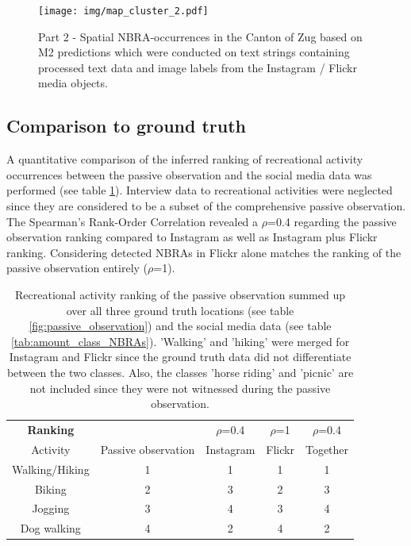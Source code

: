 \begin{figure}[h!]
   \centering
   \texttt{[image: img/map\_cluster\_2.pdf]}
   \caption{Part 2 - Spatial NBRA-occurrences in the Canton of Zug based on M2 predictions which were conducted on text strings containing processed text data and image labels from the Instagram / Flickr media objects.}
   \label{fig:map_cluster_2}
\end{figure}

\subsection{Comparison to ground truth} \label{results_comp_ground_truth}
A quantitative comparison of the inferred ranking of recreational activity occurrences between the passive observation and the social media data was performed (see table \ref{tab:compare_ranking}). Interview data to recreational activities were neglected since they are considered to be a subset of the comprehensive passive observation. The Spearman's Rank-Order Correlation revealed a $\rho$=0.4 regarding the passive observation ranking compared to Instagram as well as Instagram plus Flickr ranking. Considering detected NBRAs in Flickr alone matches the ranking of the passive observation entirely ($\rho$=1). \\

\begin{table}[h!]
\begin{center}
\caption{Recreational activity ranking of the passive observation summed up over all three ground truth locations (see table \ref{fig:passive_observation}) and the social media data (see table \ref{tab:amount_class_NBRAs}). 'Walking' and 'hiking' were merged for Instagram and Flickr since the ground truth data did not differentiate between the two classes. Also, the classes 'horse riding' and 'picnic' are not included since they were not witnessed during the passive observation.}\vspace{1ex}
\label{tab:compare_ranking}
\begin{tabular}{ccccc}\hline
\textbf{\large{Ranking}}  & & $\rho$=0.4 & $\rho$=1 & $\rho$=0.4\\
Activity & Passive observation & Instagram & Flickr & Together\footnotemark\\ \hline
Walking/Hiking & 1 & 1 & 1 & 1\\
Biking & 2 & 3 & 2 & 3 \\
Jogging & 3 & 4 & 3 & 4\\
Dog walking & 4 & 2 & 4 & 2 \\
\hline
\end{tabular}
\end{center}
\end{table}

